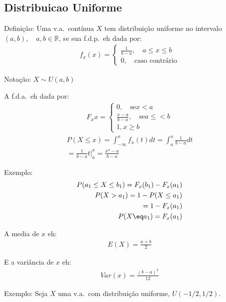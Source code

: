 \documentclass[11pt,a4paper]{book}
\begin{document}
   \subsection{Distribuicao Uniforme} 
   \begin{description}
     \item {Definição}: Uma v.a.\ contínua $X$ tem distribuição uniforme no intervalo $(a,b), \quad a,b \in \mathbb{R}$,
       se sua f.d.p.\ eh dada por:
\begin{align}
  f_x(x) = \begin{cases}
\frac{1}{b-a}, \quad a \leq x \leq b  \\
   0, \quad \text{caso contrário}
  \end{cases}
\end{align}
\item{Notação}: $X \mathtt{\sim} U(a,b)$
\item A f.d.a.\ eh dada por:
  \begin{align}
    F_x{x} = \begin{cases}
      0, \quad \text{se} x<a \\
      \frac{x-a}{b-a}, \quad \text{se} a\leq<b\\
      1, x \ge b
    \end{cases}
  \end{align}
  \begin{align}
    P(X \leq x) = \int_{- \infty}^{x} f_{x} (t) dt = \int_{a}^{x} \frac{1}{b-a} dt\\
    \nonumber = \frac{1}{b-a}t |_{a}^{x} = \frac{x^a -a}{b-a}
  \end{align}
\item{Exemplo}:
  \begin{align*}
    P(a_1 \leq X \leq b_1) = F_{x} (b_1) - F_{x}(a_1) \\
    P(X > a_1)= 1- P(X \leq a_1) \\
    = 1-F_{x} (a_1) \\
    P(X \eq a_1)= F_{x}(a_1)
  \end{align*}
 \item A media de $x$ eh:
   \begin{align*}
     E(X) = \frac{a+b}{2}
   \end{align*}
 \item E a variância de $x$ eh:
   \begin{align*}
     Var(x) = \frac{ \left(b-a\right)^2 }{12}
   \end{align*}
   \item{Exemplo}: Seja $X$ uma v.a.\ com distribuição uniforme, $U(-1/2 , 1/2). $

\end{description}
\end{document}
